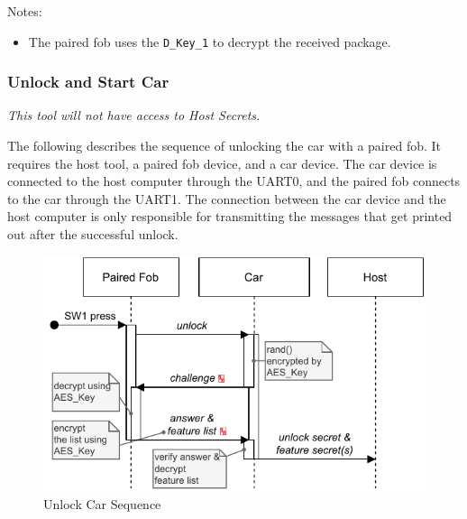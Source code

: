 \documentclass[11pt,oneside,onecolumn,letterpaper]{article}
\begin{document}
Notes:
\begin{itemize}
	\item The paired fob uses the \verb|D_Key_1| to decrypt the received package.
\end{itemize}

\subsubsection{Unlock and Start Car}

\textit{This tool will not have access to Host Secrets.}

The following describes the sequence of unlocking the car with a paired fob. It requires the host tool, a paired fob device, and a car device. The car device is connected to the host computer through the UART0, and the paired fob connects to the car through the UART1. The connection between the car device and the host computer is only responsible for transmitting the messages that get printed out after the successful unlock.

\begin{figure}[!htbp]
	\begin{centering}
		\includegraphics[width = .6\textwidth]{pic/unlock.pdf}
		\caption{Unlock Car Sequence}
		\label{fig:unlock}
	\end{centering}	
\end{figure}
\end{document}
